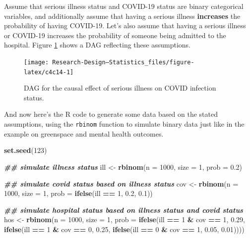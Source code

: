 \documentclass[
]{book}
\newenvironment{Shaded}{\begin{snugshade}}{\end{snugshade}}
\newcommand{\AttributeTok}[1]{\textcolor[rgb]{0.13,0.29,0.53}{#1}}
\newcommand{\DecValTok}[1]{\textcolor[rgb]{0.00,0.00,0.81}{#1}}
\newcommand{\DocumentationTok}[1]{\textcolor[rgb]{0.56,0.35,0.01}{\textbf{\textit{#1}}}}
\newcommand{\FloatTok}[1]{\textcolor[rgb]{0.00,0.00,0.81}{#1}}
\newcommand{\FunctionTok}[1]{\textcolor[rgb]{0.13,0.29,0.53}{\textbf{#1}}}
\newcommand{\NormalTok}[1]{#1}
\newcommand{\OtherTok}[1]{\textcolor[rgb]{0.56,0.35,0.01}{#1}}
\newcommand{\SpecialCharTok}[1]{\textcolor[rgb]{0.81,0.36,0.00}{\textbf{#1}}}
\begin{document}
Assume that serious illness status and COVID-19 status are binary categorical variables, and additionally assume that having a serious illness \textbf{increases} the probability of having COVID-19. Let's also assume that having a serious illness or COVID-19 increases the probability of someone being admitted to the hospital. Figure \ref{fig:c4c14} shows a DAG reflecting these assumptions.

\begin{figure}

{\centering \texttt{[image: Research-Design---Statistics\_files/figure-latex/c4c14-1]} 

}

\caption{DAG for the causal effect of serious illness on COVID infection status.}\label{fig:c4c14}
\end{figure}

And now here's the R code to generate some data based on the stated assumptions, using the \texttt{rbinom} function to simulate binary data just like in the example on greenspace and mental health outcomes.

\begin{Shaded}
\begin{Highlighting}[]
\FunctionTok{set.seed}\NormalTok{(}\DecValTok{123}\NormalTok{)}

\DocumentationTok{\#\# simulate illness status}
\NormalTok{ill }\OtherTok{\textless{}{-}} \FunctionTok{rbinom}\NormalTok{(}\AttributeTok{n =} \DecValTok{1000}\NormalTok{, }\AttributeTok{size =} \DecValTok{1}\NormalTok{, }\AttributeTok{prob =} \FloatTok{0.2}\NormalTok{)}

\DocumentationTok{\#\# simulate covid status based on illness status}
\NormalTok{cov }\OtherTok{\textless{}{-}} \FunctionTok{rbinom}\NormalTok{(}\AttributeTok{n =} \DecValTok{1000}\NormalTok{, }\AttributeTok{size =} \DecValTok{1}\NormalTok{, }\AttributeTok{prob =} \FunctionTok{ifelse}\NormalTok{(ill }\SpecialCharTok{==} \DecValTok{1}\NormalTok{, }\FloatTok{0.2}\NormalTok{, }\FloatTok{0.1}\NormalTok{))}

\DocumentationTok{\#\# simulate hospital status based on illness status and covid status}
\NormalTok{hos }\OtherTok{\textless{}{-}} \FunctionTok{rbinom}\NormalTok{(}\AttributeTok{n =} \DecValTok{1000}\NormalTok{, }\AttributeTok{size =} \DecValTok{1}\NormalTok{, }\AttributeTok{prob =} \FunctionTok{ifelse}\NormalTok{(ill }\SpecialCharTok{==} \DecValTok{1} \SpecialCharTok{\&}\NormalTok{ cov }\SpecialCharTok{==} \DecValTok{1}\NormalTok{, }\FloatTok{0.29}\NormalTok{, }
                                         \FunctionTok{ifelse}\NormalTok{(ill }\SpecialCharTok{==} \DecValTok{1} \SpecialCharTok{\&}\NormalTok{ cov }\SpecialCharTok{==} \DecValTok{0}\NormalTok{, }\FloatTok{0.25}\NormalTok{,}
                                         \FunctionTok{ifelse}\NormalTok{(ill }\SpecialCharTok{==} \DecValTok{0} \SpecialCharTok{\&}\NormalTok{ cov }\SpecialCharTok{==} \DecValTok{1}\NormalTok{, }\FloatTok{0.05}\NormalTok{, }\FloatTok{0.01}\NormalTok{))))}
\end{Highlighting}
\end{Shaded}
\end{document}
